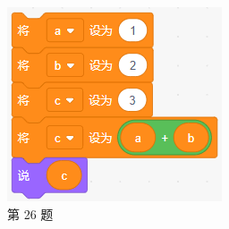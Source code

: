 \documentclass[10pt, a4paper]{article}
\begin{document}
\begin{figure}[htbp]
\begin{minipage}[t]{.34\textwidth}
        \end{minipage}
        \begin{minipage}[t]{.19\textwidth}
            \centering
            \includegraphics[width=\textwidth]{figure/26.png}
            \caption*{第 26 题}
        \end{minipage}
    \end{figure}
\end{document}

